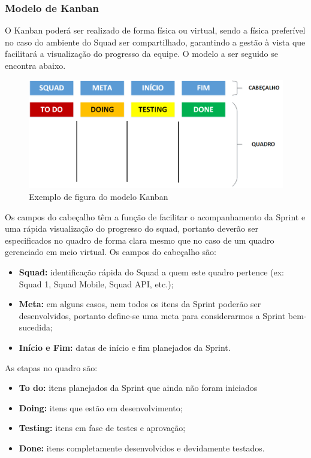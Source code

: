 \documentclass[	DIV=calc,%
							paper=a4,%
							fontsize=12pt,%
							onecolumn]{scrartcl}	 					%
\begin{document}
\subsubsection{Modelo de Kanban}
O Kanban poderá ser realizado de forma física ou virtual, sendo a física preferível no caso do ambiente do Squad ser compartilhado, garantindo a gestão à vista que facilitará a visualização do progresso da equipe. O modelo a ser seguido se encontra abaixo.
\begin{figure}[!htb]
	\centering
	\includegraphics[width=\textwidth]{Kanban}
	\caption{Exemplo de figura do modelo Kanban}
	\label{Kanban}
\end{figure}
Os campos do cabeçalho têm a função de facilitar o acompanhamento da Sprint e uma rápida visualização do progresso do squad, portanto deverão ser especificados no quadro de forma clara mesmo que no caso de um quadro gerenciado em meio virtual. Os campos do cabeçalho são:
\begin{itemize}
	\item \textbf{Squad:} identificação rápida do Squad a quem este quadro pertence (ex: Squad 1, Squad Mobile, Squad API, etc.);
	\item \textbf{Meta:} em alguns casos, nem todos os itens da Sprint poderão ser desenvolvidos, portanto define-se uma meta para considerarmos a Sprint bem-sucedida;
	\item \textbf{Início e Fim:} datas de início e fim planejados da Sprint.
\end{itemize}
As etapas no quadro são:
\begin{itemize}
	\item \textbf{To do:} itens planejados da Sprint que ainda não foram iniciados
	\item \textbf{Doing:} itens que estão em desenvolvimento;
	\item \textbf{Testing:} itens em fase de testes e aprovação;
	\item \textbf{Done:} itens completamente desenvolvidos e devidamente testados.
\end{itemize}
\end{document}
